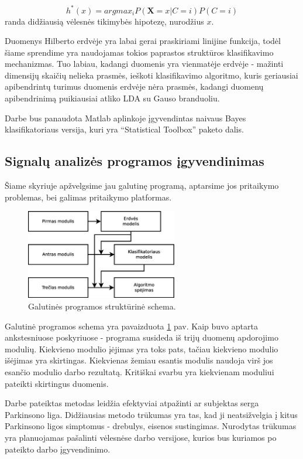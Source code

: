 \documentclass[]{vgtuef}
\begin{document}
\begin{equation}
h^*(x) = arg max_i P(\mathbf{X}=x|C=i)P(C=i)
\end{equation}
randa didžiausią vėlesnės tikimybės hipotezę, nurodžius $x$.

Duomenys Hilberto erdvėje yra labai gerai praskiriami linijine funkcija, todėl šiame sprendime yra naudojamas tokios paprastos struktūros klasifikavimo mechanizmas. Tuo labiau, kadangi duomenis yra vienmatėje erdvėje - mažinti dimensijų skaičių nelieka prasmės, ieškoti klasifikavimo algoritmo, kuris geriausiai apibendrintų turimus duomenis erdvėje nėra prasmės, kadangi duomenų apibendrinimą puikiausiai atliko LDA su Gauso branduoliu.

Darbe bus panaudota Matlab aplinkoje įgyvendintas naivaus Bayes klasifikatoriaus versija, kuri yra ``Statistical Toolbox'' paketo dalis.

\subsection{Signalų analizės programos įgyvendinimas}
\label{subsec:total_program}

Šiame skyriuje apžvelgsime jau galutinę programą, aptarsime jos pritaikymo problemas, bei galimas pritaikymo platformas.

\begin{figure}[!t]
  \centering
  \includegraphics[width=250px]{figures/galutine_programa.eps}
  \caption{Galutinės programos struktūrinė schema.}
  \label{fig:galutine_programa}
\end{figure}

Galutinė programos schema yra pavaizduota \ref{fig:galutine_programa} pav. Kaip buvo aptarta ankstesniuose poskyriuose - programa susideda iš trijų duomenų apdorojimo modulių. Kiekvieno modulio įėjimas yra toks pats, tačiau kiekvieno modulio išėjimas yra skirtingas. Kiekvienas žemiau esantis modulis naudoja virš jos esančio modulio darbo rezultatą. Kritiškai svarbu yra kiekvienam moduliui pateikti skirtingus duomenis.

Darbe pateiktas metodas leidžia efektyviai atpažinti ar subjektas serga Parkinsono liga. Didžiausias metodo trūkumas yra tas, kad ji neatsižvelgia į kitus Parkinsono ligos simptomus - drebulys, eisenos sustingimas. Nurodytas trūkumas yra planuojamas pašalinti vėlesnėse darbo versijose, kurios bus kuriamos po pateikto darbo įgyvendinimo.
\end{document}
